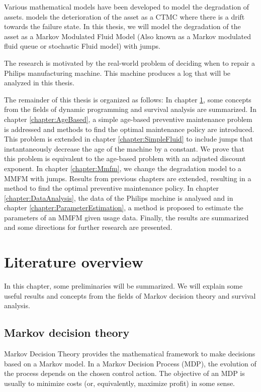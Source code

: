 \documentclass[a4paper]{thesis}
\theoremstyle{definition}
\begin{document}
Various mathematical models have been developed to model the degradation of assets.
\cite{Derman1963} models the deterioration of the asset as a CTMC where there is a drift towards the failure state.
In this thesis, we will model the degradation of the asset as a Markov Modulated Fluid Model (Also known as a Markov modulated fluid queue or stochastic Fluid model) with jumps.

The research is motivated by the real-world problem of deciding when to repair a Philips manufacturing machine.
This machine produces a log that will be analyzed in this thesis.

The remainder of this thesis is organized as follows:
In chapter \ref{chapter:literatureOverview}, some concepts from the fields of dynamic programming and survival analysis are summarized.  
In chapter \ref{chapter:AgeBased}, a simple age-based preventive maintenance problem is addressed and methods to find the optimal maintenance policy are introduced.
This problem is extended in chapter \ref{chapter:SimpleFluid} to include jumps that instantaneously decrease the age of the machine by a constant.
We prove that this problem is equivalent to the age-based problem with an adjusted discount exponent.
In chapter \ref{chapter:Mmfm}, we change the degradation model to a MMFM with jumps.
Results from previous chapters are extended, resulting in a method to find the optimal preventive maintenance policy.
In chapter \ref{chapter:DataAnalysis}, the data of the Philips machine is analysed and in chapter \ref{chapter:ParameterEstimation}, a method is proposed to estimate the parameters of an MMFM given usage data.
Finally, the results are summarized and some directions for further research are presented.

 
\chapter{Literature overview}\label{chapter:literatureOverview}
In this chapter, some preliminaries will be summarized.
We will explain some useful results and concepts from the fields of Markov decision theory and survival analysis.

\section{Markov decision theory}
Markov Decision Theory provides the mathematical framework to make decisions based on a Markov model.
In a Markov Decision Process (MDP), the evolution of the process depends on the chosen control action.
The objective of an MDP is usually to minimize costs (or, equivalently, maximize profit) in some sense.
\end{document}

